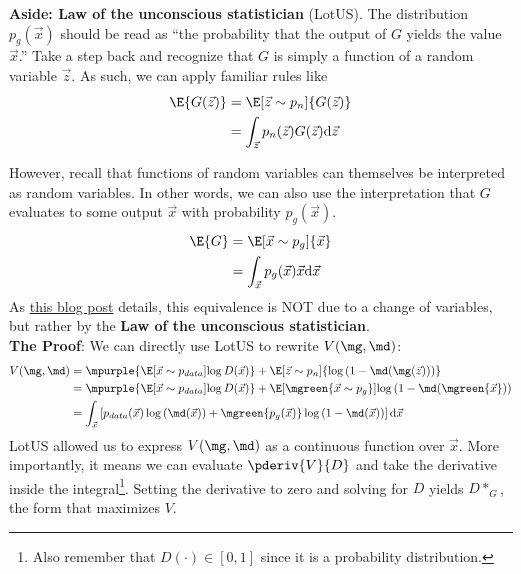 \documentclass[11pt]{article}
\begin{document}
\begin{example}
	
	\textbf{Aside: Law of the unconscious statistician} (LotUS). 
	The distribution $p_g(\vec x)$ should be read as ``the probability that the output of $G$ yields the value $\vec x$.'' Take a step back and recognize that $G$ is simply a function of a random variable $\vec z$. As such, we can apply familiar rules like
	\begin{align}
	\E{G(\vec z)}
	&= \E[\vec z \sim p_n]{G(\vec z)} \\
	&= \int_{\vec z} p_n(\vec z) G(\vec z) \mathrm{d}\vec z
	\end{align}
	
	However, recall that functions of random variables can themselves be interpreted as random variables. In other words, we can also use the interpretation that $G$ evaluates to some output $\vec x$ with probability $p_g(\vec x)$. 
	\begin{align}
	\E{G} 
	&= \E[\vec x \sim p_g]{\vec x} \\
	&= \int_{\vec x} p_g(\vec x) \vec x \mathrm{d}\vec x
	\end{align}
	As \href{https://srome.github.io/An-Annotated-Proof-of-Generative-Adversarial-Networks-with-Implementation-Notes/}{this blog post} details, this equivalence is NOT due to a change of variables, but rather by the \textbf{Law of the unconscious statistician}. \\
	
	
	\textbf{The Proof}: We can directly use LotUS to rewrite $V(\mg, \md)$:
	\begin{align}
	V(\mg, \md)
	&= \mpurple{ \E[\vec x \sim p_{data}]{\log D(\vec x)} } 
	+ \E[\vec z \sim p_n]{\log \left( 1 - \md ( \mg (\vec z) )  \right) } \\
	&=  \mpurple{ \E[\vec x \sim p_{data}]{\log D(\vec x)} } 
	+ \E[\mgreen{ \vec x \sim p_g } ]{  \log \left(1 -  \md (\mgreen{ \vec x } )   \right) } \\
	&= \int_{\vec x} \left[
	p_{data}(\vec x) \log \left(\md (\vec x)\right) +
	\mgreen{p_g(\vec x)} \log \left(1 - \md(\vec x)\right)
	\right] \mathrm{d} \vec x
	\end{align}
	LotUS allowed us to express $V(\mg, \md)$ as a continuous function over $\vec x$. More importantly, it means we can evaluate $\pderiv{V}{D}$ and take the derivative inside the integral\footnote{Also remember that $D(\cdot) \in [0, 1]$ since it is a probability distribution.}. Setting the derivative to zero and solving for $D$ yields $D*_G$, the form that maximizes $V$. 
\end{example}
\end{document}
